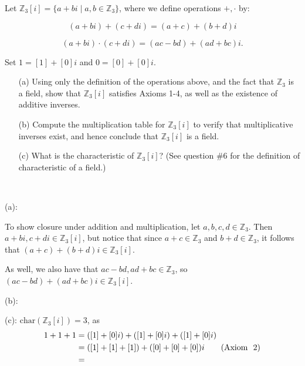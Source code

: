 \documentclass{article}
\theoremstyle{plain} %
\numberwithin{thm}{section} %
\theoremstyle{definition}
\begin{document}
    \newpage
    \begin{question}{3}
        Let \( \mathbb{Z}_3[i] = \{ a + bi \mid a, b \in \mathbb{Z}_3 \} \), where we define operations \( +, \cdot \) by:

        \[
        (a + bi) + (c + di) = (a + c) + (b + d)i
        \]

        \[
        (a + bi) \cdot (c + di) = (ac - bd) + (ad + bc)i.
        \]

        Set \( 1 = [1] + [0]i \) and \( 0 = [0] + [0]i \).

        \begin{enumerate}
            \item[(a)] Using only the definition of the operations above, and the fact that \( \mathbb{Z}_3 \) is a field, show that \( \mathbb{Z}_3[i] \) satisfies Axioms 1-4, as well as the existence of additive inverses.
            
            \item[(b)] Compute the multiplication table for \( \mathbb{Z}_3[i] \) to verify that multiplicative inverses exist, and hence conclude that \( \mathbb{Z}_3[i] \) is a field.
            
            \item[(c)] What is the characteristic of \( \mathbb{Z}_3[i] \)? (See question \#6 for the definition of characteristic of a field.)
        \end{enumerate}
        \tcblower
        \ 

        (a):

        To show closure under addition and multiplication, let \(a,b,c,d \in \mathbb{Z}_3\). Then \(a + bi, c + di \in \mathbb{Z}_3[i]\), but notice that since \(a + c \in \mathbb{Z}_3\) and \(b + d \in \mathbb{Z}_3\), it follows that \((a + c) + (b + d)i \in \mathbb{Z}_3[i]\).

        As well, we also have that \(ac - bd, ad + bc \in \mathbb{Z}_3\), so \((ac - bd) + (ad  +bc)i \in \mathbb{Z}_3[i]\).

        \medskip

        (b):

        \medskip

        (c):
        \(\mathrm{char}(\mathbb{Z}_3[i]) = 3\), as
        \begin{align*}
            1 + 1 + 1 &= ([1] + [0]i) + ([1] + [0]i) + ([1] + [0]i) \\
            &= ([1] + [1] + [1]) + ([0] + [0] + [0])i \tag{\text{Axiom } 2} \\
            &= 
        \end{align*}
    \end{question}
\end{document}
